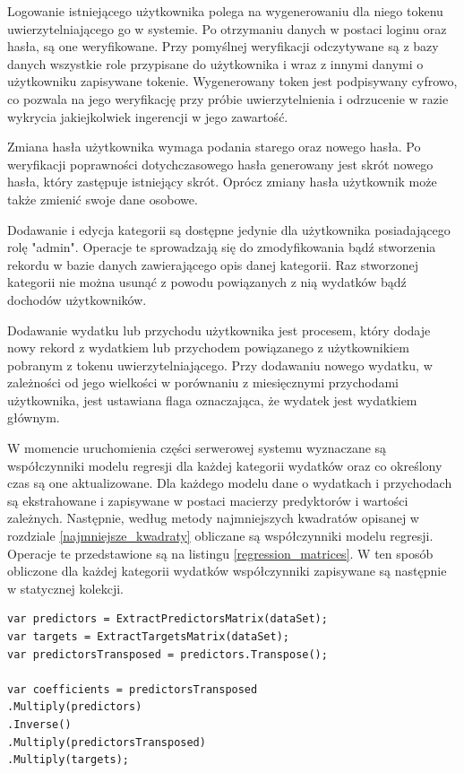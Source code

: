 Logowanie istniejącego użytkownika polega na wygenerowaniu dla niego tokenu uwierzytelniającego go w systemie. Po otrzymaniu danych w postaci loginu oraz hasła, są one weryfikowane. Przy pomyślnej weryfikacji odczytywane są z bazy danych wszystkie role przypisane do użytkownika i wraz z innymi danymi o użytkowniku zapisywane tokenie. Wygenerowany token jest podpisywany cyfrowo, co pozwala na jego weryfikację przy próbie uwierzytelnienia i odrzucenie w razie wykrycia jakiejkolwiek ingerencji w jego zawartość.

Zmiana hasła użytkownika wymaga podania starego oraz nowego hasła. Po weryfikacji poprawności dotychczasowego hasła generowany jest skrót nowego hasła, który zastępuje istniejący skrót. Oprócz zmiany hasła użytkownik może także zmienić swoje dane osobowe.

Dodawanie i edycja kategorii są dostępne jedynie dla użytkownika posiadającego rolę "admin". Operacje te sprowadzają się do zmodyfikowania bądź stworzenia rekordu w bazie danych zawierającego opis danej kategorii. Raz stworzonej kategorii nie można usunąć z powodu powiązanych z nią wydatków bądź dochodów użytkowników.

Dodawanie wydatku lub przychodu użytkownika jest procesem, który dodaje nowy rekord z wydatkiem lub przychodem powiązanego z użytkownikiem pobranym z tokenu uwierzytelniającego. Przy dodawaniu nowego wydatku, w zależności od jego wielkości w porównaniu z miesięcznymi przychodami użytkownika, jest ustawiana flaga oznaczająca, że wydatek jest wydatkiem głównym.

W momencie uruchomienia części serwerowej systemu wyznaczane są współczynniki modelu regresji dla każdej kategorii wydatków oraz co określony czas są one aktualizowane. Dla każdego modelu dane o wydatkach i przychodach są ekstrahowane i zapisywane w postaci macierzy predyktorów i wartości zależnych. Następnie, według metody najmniejszych kwadratów opisanej w rozdziale \ref{najmniejsze_kwadraty} obliczane są współczynniki modelu regresji. Operacje te przedstawione są na listingu \ref{regression_matrices}. W ten sposób obliczone dla każdej kategorii wydatków współczynniki zapisywane są następnie w statycznej kolekcji.
\begin{lstlisting}[label={regression_matrices}, caption={Operacje wyznaczania współczynników modelu regresji.}, captionpos=b]
var predictors = ExtractPredictorsMatrix(dataSet);
var targets = ExtractTargetsMatrix(dataSet);
var predictorsTransposed = predictors.Transpose();

var coefficients = predictorsTransposed
.Multiply(predictors)
.Inverse()
.Multiply(predictorsTransposed)
.Multiply(targets);
\end{lstlisting}


